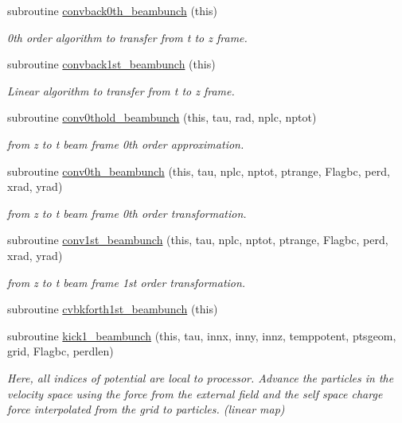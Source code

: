 \begin{DoxyCompactItemize}
subroutine \mbox{\hyperlink{namespacebeambunchclass_ad12625a90fb4a096ff15ba55f655b148}{convback0th\+\_\+beambunch}} (this)
\begin{DoxyCompactList}\small\item\em 0th order algorithm to transfer from t to z frame. \end{DoxyCompactList}\item 
subroutine \mbox{\hyperlink{namespacebeambunchclass_a704068cca17e98c6568c1e6056d1c4d6}{convback1st\+\_\+beambunch}} (this)
\begin{DoxyCompactList}\small\item\em Linear algorithm to transfer from t to z frame. \end{DoxyCompactList}\item 
subroutine \mbox{\hyperlink{namespacebeambunchclass_a374fdc0e530a8835113fcd674283a150}{conv0thold\+\_\+beambunch}} (this, tau, rad, nplc, nptot)
\begin{DoxyCompactList}\small\item\em from z to t beam frame 0th order approximation. \end{DoxyCompactList}\item 
subroutine \mbox{\hyperlink{namespacebeambunchclass_ad456951b863b3dfab6eb7fa018e17230}{conv0th\+\_\+beambunch}} (this, tau, nplc, nptot, ptrange, Flagbc, perd, xrad, yrad)
\begin{DoxyCompactList}\small\item\em from z to t beam frame 0th order transformation. \end{DoxyCompactList}\item 
subroutine \mbox{\hyperlink{namespacebeambunchclass_a0b46fd8b4c41577688761ad62175772b}{conv1st\+\_\+beambunch}} (this, tau, nplc, nptot, ptrange, Flagbc, perd, xrad, yrad)
\begin{DoxyCompactList}\small\item\em from z to t beam frame 1st order transformation. \end{DoxyCompactList}\item 
subroutine \mbox{\hyperlink{namespacebeambunchclass_acacb775484bda2729c3da9adbbeffc53}{cvbkforth1st\+\_\+beambunch}} (this)
\item 
subroutine \mbox{\hyperlink{namespacebeambunchclass_abf23fdc1e8ca69fe7fe8f2995fbc1bcc}{kick1\+\_\+beambunch}} (this, tau, innx, inny, innz, temppotent, ptsgeom, grid, Flagbc, perdlen)
\begin{DoxyCompactList}\small\item\em Here, all indices of potential are local to processor. Advance the particles in the velocity space using the force from the external field and the self space charge force interpolated from the grid to particles. (linear map) \end{DoxyCompactList}\item 

\end{DoxyCompactItemize}
